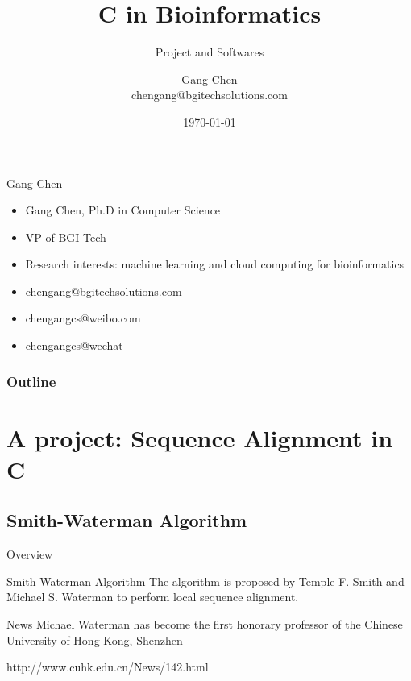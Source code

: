 \documentclass[UTF8]{beamer}
\title{C in Bioinformatics}
\subtitle{Project and Softwares}
\author{Gang Chen\\ chengang@bgitechsolutions.com}
\date{\today}
\begin{document}
\begin{frame}[t]{Gang Chen}
  \begin{itemize}
    \item Gang Chen, Ph.D in Computer Science
    \item VP of BGI-Tech
    \item Research interests: machine learning and cloud computing for
    bioinformatics
    \item chengang@bgitechsolutions.com
    \item chengangcs@weibo.com
    \item chengangcs@wechat
  \end{itemize}
\end{frame}


\begin{frame}
\titlepage
\end{frame}
\begin{frame}[t]\frametitle{Outline}
\tableofcontents[hideallsubsections]
\end{frame}

\section{A project: Sequence Alignment in C}

\subsection{Smith-Waterman Algorithm}
\begin{frame}[t]{Overview}
\begin{block}{Smith-Waterman Algorithm}
  The algorithm is proposed by Temple F. Smith and Michael S. Waterman to
  perform local sequence alignment.
\end{block}

\begin{block}{News}
  Michael Waterman has become the first honorary professor of the Chinese
  University of Hong Kong, Shenzhen

  http://www.cuhk.edu.cn/News/142.html
\end{block}

\end{frame}
\end{document}
